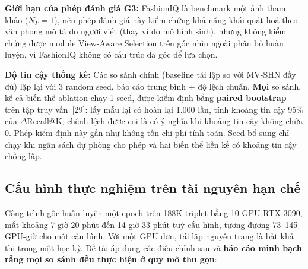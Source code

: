 \documentclass[a4paper]{article}
\begin{document}
\textbf{Giới hạn của phép đánh giá G3:} FashionIQ là benchmark một ảnh tham khảo ($N_P = 1$), nên phép đánh giá này kiểm chứng khả năng khái quát hoá theo văn phong mô tả do người viết (thay vì do mô hình sinh), nhưng không kiểm chứng được module View-Aware Selection trên góc nhìn ngoài phân bố huấn luyện, vì FashionIQ không có cấu trúc đa góc để lựa chọn.

\textbf{Độ tin cậy thống kê:} Các so sánh chính (baseline tái lập so với MV-SHN đầy đủ) lặp lại với 3 random seed, báo cáo trung bình $\pm$ độ lệch chuẩn. \textbf{Mọi} so sánh, kể cả biến thể ablation chạy 1 seed, được kiểm định bằng \textbf{paired bootstrap} trên tập truy vấn~[29]: lấy mẫu lại có hoàn lại 1.000 lần, tính khoảng tin cậy 95\% của $\Delta$Recall@K; chênh lệch được coi là có ý nghĩa khi khoảng tin cậy không chứa 0. Phép kiểm định này gần như không tốn chi phí tính toán. Seed bổ sung chỉ chạy khi ngân sách dự phòng cho phép và hai biến thể liền kề có khoảng tin cậy chồng lấp.

\subsection{Cấu hình thực nghiệm trên tài nguyên hạn chế}\label{sec:config}

Công trình gốc huấn luyện một epoch trên 188K triplet bằng 10 GPU RTX 3090, mất khoảng 7 giờ 20 phút đến 14 giờ 33 phút tuỳ cấu hình, tương đương 73--145 GPU-giờ cho một cấu hình. Với một GPU đơn, tái lập nguyên trạng là bất khả thi trong một học kỳ. Đề tài áp dụng các điều chỉnh sau và \textbf{báo cáo minh bạch rằng mọi so sánh đều thực hiện ở quy mô thu gọn}:
\end{document}

